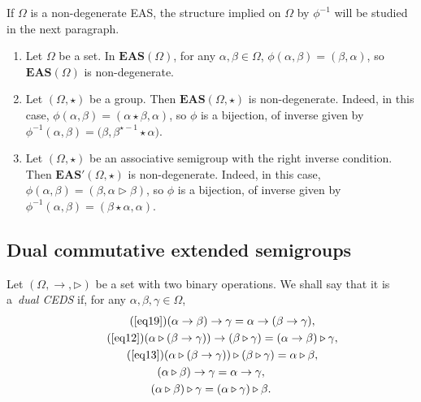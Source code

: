 \documentclass[10pt,a4paper]{amsart}
\numberwithin{equation}{section}
\newcommand{\eas}{\mathbf{EAS}}
\begin{document}
If $\Omega$ is a non-degenerate EAS, the structure implied on $\Omega$ by $\phi^{-1}$ will be studied in the next paragraph.

\begin{Example}\qquad
\begin{enumerate}\itemsep=0pt
\item[(1)] Let $\Omega$ be a set. In $\eas(\Omega)$, for any $\alpha,\beta \in \Omega$, $\phi(\alpha,\beta)=(\beta,\alpha)$, so $\eas(\Omega)$ is non-degenerate.
\item[(2)] Let $(\Omega,\star)$ be a group. Then $\eas(\Omega,\star)$ is non-degenerate. Indeed, in this case, $\phi(\alpha,\beta)=(\alpha\star\beta,\alpha)$, so $\phi$ is a bijection, of inverse given by $\phi^{-1}(\alpha,\beta)=\bigl(\beta,\beta^{\star-1}\star \alpha\bigr)$.
\item[(3)] Let $(\Omega,\star)$ be an associative semigroup with the right inverse condition. Then $\eas'(\Omega,\star)$ is non-degenerate.
Indeed, in this case, $\phi(\alpha,\beta)=(\beta,\alpha\triangleright \beta)$, so $\phi$ is a bijection, of inverse given by $\phi^{-1}(\alpha,\beta)=(\beta\star \alpha,\alpha)$.
\end{enumerate}\end{Example}


\subsection{Dual commutative extended semigroups}

\begin{Definition}
Let $(\Omega,\rightarrow,\triangleright)$ be a set with two binary operations. We shall say that it is a~\emph{dual CEDS} if, for any $\alpha,\beta,\gamma \in \Omega$,
\begin{gather}%
\tag{\ref{eq19}} (\alpha \rightarrow \beta)\rightarrow \gamma=\alpha \rightarrow (\beta \rightarrow \gamma),\\
\tag{\ref{eq12}}(\alpha \triangleright (\beta \rightarrow \gamma))\rightarrow (\beta \triangleright \gamma)=(\alpha \rightarrow \beta) \triangleright \gamma,\\
\tag{\ref{eq13}} (\alpha \triangleright (\beta \rightarrow \gamma))\triangleright (\beta \triangleright \gamma)=\alpha \triangleright \beta,\\
 (\alpha \triangleright \beta) \rightarrow \gamma=\alpha \rightarrow \gamma,\\
 (\alpha \triangleright \beta) \triangleright \gamma=(\alpha \triangleright \gamma)\triangleright \beta.
\end{gather}\end{Definition}
\end{document}
